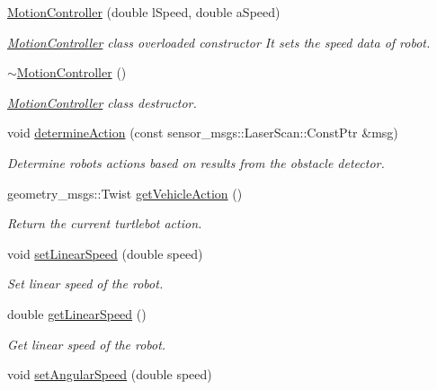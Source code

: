 \begin{DoxyCompactItemize}
\item 
\hyperlink{classMotionController_ad6e44ad9817ff4f75cc7995092b52ec4}{Motion\+Controller} (double l\+Speed, double a\+Speed)
\begin{DoxyCompactList}\small\item\em \hyperlink{classMotionController}{Motion\+Controller} class overloaded constructor It sets the speed data of robot. \end{DoxyCompactList}\item 
\hyperlink{classMotionController_aa8036ec12abe080dbcf8ecabc68ac223}{$\sim$\+Motion\+Controller} ()
\begin{DoxyCompactList}\small\item\em \hyperlink{classMotionController}{Motion\+Controller} class destructor. \end{DoxyCompactList}\item 
void \hyperlink{classMotionController_a3e0b57a37ce66bead9eee6638765638b}{determine\+Action} (const sensor\+\_\+msgs\+::\+Laser\+Scan\+::\+Const\+Ptr \&msg)
\begin{DoxyCompactList}\small\item\em Determine robot\textquotesingle{}s actions based on results from the obstacle detector. \end{DoxyCompactList}\item 
geometry\+\_\+msgs\+::\+Twist \hyperlink{classMotionController_ae7a9bb384866b1da42e42c648490123f}{get\+Vehicle\+Action} ()
\begin{DoxyCompactList}\small\item\em Return the current turtlebot action. \end{DoxyCompactList}\item 
void \hyperlink{classMotionController_a896af6f5af8e2adad21bae5e09565042}{set\+Linear\+Speed} (double speed)
\begin{DoxyCompactList}\small\item\em Set linear speed of the robot. \end{DoxyCompactList}\item 
double \hyperlink{classMotionController_ab5fc3180f5eb4b91ada6d2f56c6ac83d}{get\+Linear\+Speed} ()
\begin{DoxyCompactList}\small\item\em Get linear speed of the robot. \end{DoxyCompactList}\item 
void \hyperlink{classMotionController_aad091d37bb3e99de8981c74f671b16c3}{set\+Angular\+Speed} (double speed)

\end{DoxyCompactItemize}
